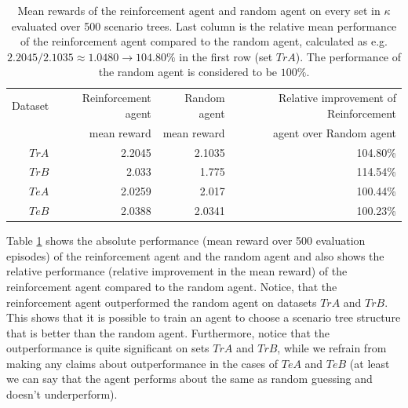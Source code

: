 \begin{table}[H]
\footnotesize
\begin{tabular}{rrrr}
\hline
Dataset & Reinforcement agent & Random agent& Relative improvement of Reinforcement \\
& mean reward & mean reward &  agent over Random agent 
\\
\hline
$TrA$ & 2.2045              & 2.1035       & 104.80\%                                                                                        \\
$TrB$ & 2.033               & 1.775        & 114.54\%                                                                                        \\
$TeA$ & 2.0259              & 2.017        & 100.44\%                                                                                        \\
$TeB$ & 2.0388              & 2.0341       & 100.23\%                                                                                       
\\
\hline
\end{tabular}
\caption{Mean rewards of the reinforcement agent and random agent on every set in $\kappa$ evaluated over 500 scenario trees. Last column is the relative mean performance of the reinforcement agent compared to the random agent, calculated as e.g. $2.2045/2.1035 \approx 1.0480 \rightarrow 104.80\%                                                                                       $ in the first row (set $TrA$). The performance of the random agent is considered to be $100\%                                                                              $.}
\label{tab:performance_no_penalty}
\end{table}

Table \ref{tab:performance_no_penalty} shows the absolute performance (mean reward over 500 evaluation episodes) of the reinforcement agent and the random agent and also shows the relative performance (relative improvement in the mean reward) of the reinforcement agent compared to the random agent. Notice, that the reinforcement agent outperformed the random agent on datasets $TrA$ and $TrB$. This shows that it is possible to train an agent to choose a scenario tree structure that is better than the random agent. Furthermore, notice that the outperformance is quite significant on sets $TrA$ and $TrB$, while we refrain from making any claims about outperformance in the cases of $TeA$ and $TeB$ (at least we can say that the agent performs about the same as random guessing and doesn't underperform). 


